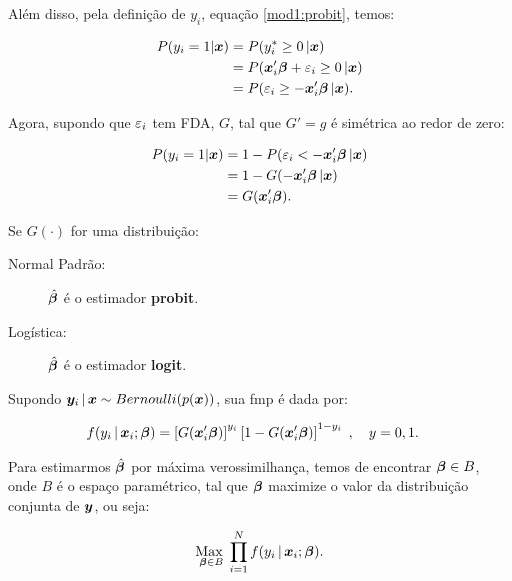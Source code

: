 \documentclass[11pt, oneside, a4paper, article]{article}
\numberwithin{equation}{section}
\begin{document}
\begin{description}
Além disso, pela definição de $y_{i}$, equação \eqref{mod1:probit}, temos:

\vspace{-1 em}
\begin{align*}
	P( y_{i} = 1 | \boldsymbol{x} ) &= P(y_{i}^{*} \geq 0 \, | \boldsymbol{x} )
\\
&= P( \boldsymbol{x}_{i}' \boldsymbol{\beta} + \varepsilon_{i} \geq 0 \, | \boldsymbol{x} )
\\
&= P( \varepsilon_{i} \geq - \boldsymbol{x}_{i}' \boldsymbol{\beta}  \, | \boldsymbol{x} ).
\end{align*}

\noindent
Agora, supondo que $\varepsilon_{i}$ tem FDA, $G$, tal que $G'=g$ é simétrica ao redor de zero:

\vspace{-1 em}
\begin{align*}
P( y_{i} = 1 | \boldsymbol{x} ) 
&= 1 - P( \varepsilon_{i} < - \boldsymbol{x}_{i}' \boldsymbol{\beta}  \, | \boldsymbol{x} )
\\
&= 1 - G( - \boldsymbol{x}_{i}' \boldsymbol{\beta}  \, | \boldsymbol{x} )
\\
&= G( \boldsymbol{x}_{i}' \boldsymbol{\beta} ).
\end{align*}

Se $G(\cdot)$ for uma distribuição:

\begin{description}
	\item [Normal Padrão:] $\hat{\boldsymbol{\beta}}$ é o estimador \textbf{probit}.
	\item [Logística:] $\hat{\boldsymbol{\beta}}$ é o estimador \textbf{logit}.
\end{description}

Supondo $\boldsymbol{y}_{i} \, | \, \boldsymbol{x} \sim Bernoulli(p(\boldsymbol{x}))$, sua fmp é dada por:

\vspace{-1 em}
\begin{align*}
f( y_{i} \, | \, \boldsymbol{x}_{i} ; \boldsymbol{\beta} ) 
&= 
\left[ G(\boldsymbol{x}_{i}' \boldsymbol{\beta} )  \right]^{y_{i}}
\left[ 1 - G(\boldsymbol{x}_{i}' \boldsymbol{\beta} )  \right]^{1 - y_{i}}
\; , \quad y=0,1.
\end{align*}

Para estimarmos $\hat{\boldsymbol{\beta}}$ por máxima verossimilhança, temos de encontrar $\boldsymbol{\beta} \in B$, onde $B$ é o espaço paramétrico, tal que $\boldsymbol{\beta}$ maximize o valor da distribuição conjunta de $\boldsymbol{y}$, ou seja:

\vspace{-1 em}
\begin{align*}
	\underset{\boldsymbol{\beta} \in B}{\text{Max }} 
	\prod_{i=1}^{N}
	f( y_{i} \, | \, \boldsymbol{x}_{i} ; \boldsymbol{\beta} ).
\end{align*}


\end{description}
\end{document}
